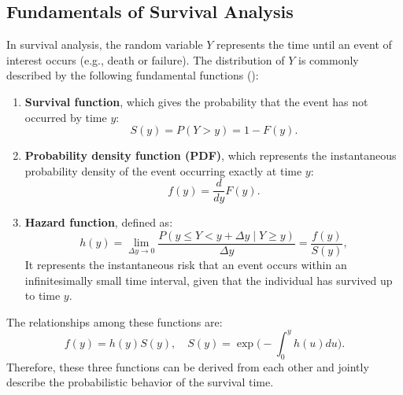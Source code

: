 \subsection{Fundamentals of Survival Analysis} \label{Fundamentals of Survival Analysis}

In survival analysis, the random variable $Y$ represents the time until an event of interest occurs (e.g., death or failure). The distribution of $Y$ is commonly described by the following fundamental functions (\cite{kleinbaum1996survival}):
\begin{enumerate}
    \item \textbf{Survival function}, which gives the probability that the event has not occurred by time $y$:
   $$
   S(y) = P(Y > y) = 1 - F(y).
   $$
   \item \textbf{Probability density function (PDF)}, which represents the instantaneous probability density of the event occurring exactly at time $y$:
   $$
   f(y) = \frac{d}{dy} F(y).
   $$
   \item \textbf{Hazard function}, defined as:
   $$
   h(y) = \lim_{\Delta y \to 0} 
   \frac{P(y \le Y < y + \Delta y \mid Y \ge y)}{\Delta y}
   = \frac{f(y)}{S(y)},
   $$
   It represents the instantaneous risk that an event occurs within an infinitesimally small time interval, given that the individual has survived up to time \( y \).
\end{enumerate}

The relationships among these functions are:
$$
f(y) = h(y) S(y),
\quad
S(y) = \exp\Big( - \int_0^y h(u) du \Big).
$$
Therefore, these three functions can be derived from each other and jointly describe the probabilistic behavior of the survival time.


